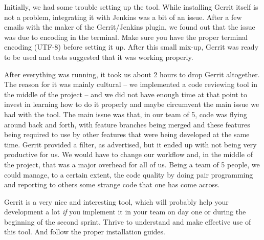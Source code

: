 Initially, we had some trouble setting up the tool. While installing Gerrit itself is not a problem, integrating it with Jenkins was a bit of an issue. After a few emails with the maker of the Gerrit/Jenkins plugin, we found out that the issue was due to encoding in the terminal. Make sure you have the proper terminal encoding (UTF-8) before setting it up. After this small mix-up, Gerrit was ready to be used and tests suggested that it was working properly.

After everything was running, it took us about 2 hours to drop Gerrit altogether. The reason for it was mainly cultural -- we implemented a code reviewing tool in the middle of the project -- and we did not have enough time at that point to invest in learning how to do it properly and maybe circumvent the main issue we had with the tool. The main issue was that, in our team of 5, code was flying around back and forth, with feature branches being merged and these features being required to use by other features that were being developed at the same time. Gerrit provided a filter, as advertised, but it ended up with not being very productive for us. We would have to change our workflow and, in the middle of the project, that was a major overhead for all of us. Being a team of 5 people, we could manage, to a certain extent, the code quality by doing pair programming and reporting to others some strange code that one has come across.

Gerrit is a very nice and interesting tool, which will probably help your development a lot \emph{if} you implement it in your team on day one or during the beginning of the second sprint. Thrive to understand and make effective use of this tool. And follow the proper installation guides.

